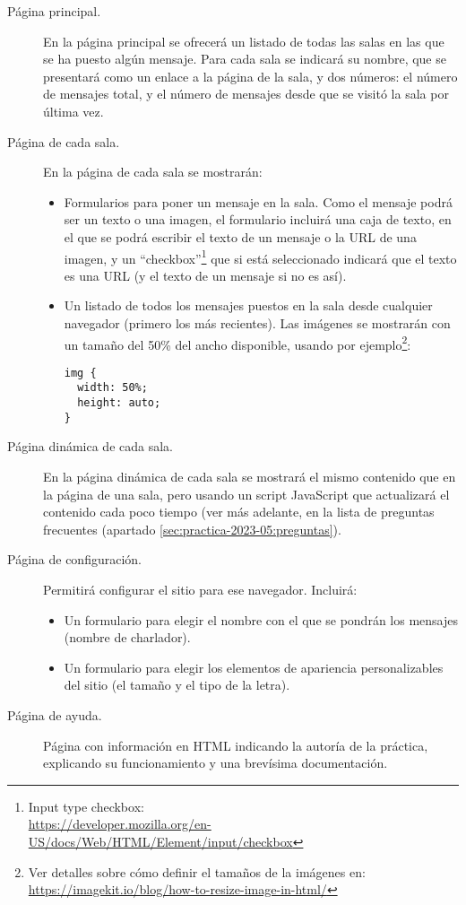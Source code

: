 \begin{description}
\item[Página principal.] En la página principal se ofrecerá un listado de todas las salas en las que se ha puesto algún mensaje. Para cada sala se indicará su nombre, que se presentará como un enlace a la página de la sala, y dos números: el número de mensajes total, y el número de mensajes desde que se visitó la sala por última vez.
\item[Página de cada sala.] En la página de cada sala se mostrarán:
  \begin{itemize}
  \item Formularios para poner un mensaje en la sala. Como el mensaje podrá ser un texto o una imagen, el formulario incluirá una caja de texto, en el que se podrá escribir el texto de un mensaje o la URL de una imagen, y un ``checkbox''\footnote{Input type checkbox: \\ \url{https://developer.mozilla.org/en-US/docs/Web/HTML/Element/input/checkbox}} que si está seleccionado indicará que el texto es una URL (y el texto de un mensaje si no es así).
  \item Un listado de todos los mensajes puestos en la sala desde cualquier navegador (primero los más recientes). Las imágenes se mostrarán con un tamaño del 50\% del ancho disponible, usando por ejemplo\footnote{Ver detalles sobre cómo definir el tamaños de la imágenes en: \\ \url{https://imagekit.io/blog/how-to-resize-image-in-html/}}:

\begin{verbatim}
img {
  width: 50%;
  height: auto;
}
\end{verbatim}

  \end{itemize}

\item[Página dinámica de cada sala.] En la página dinámica de cada sala se mostrará el mismo contenido que en la página de una sala, pero usando un script JavaScript que actualizará el contenido cada poco tiempo (ver más adelante, en la lista de preguntas frecuentes (apartado \ref{sec:practica-2023-05:preguntas}).
  
\item[Página de configuración.] Permitirá configurar el sitio para ese navegador. Incluirá:
  \begin{itemize}
  \item Un formulario para elegir el nombre con el que se pondrán los mensajes (nombre de charlador).
  \item Un formulario para elegir los elementos de apariencia personalizables del sitio (el tamaño y el tipo de la letra).
  \end{itemize}
\item[Página de ayuda.] Página con información en HTML indicando la autoría de la práctica, explicando su funcionamiento y una brevísima documentación.
\end{description}

